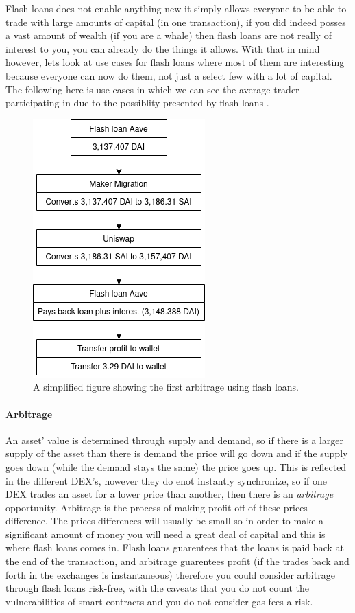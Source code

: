Flash loans does not enable anything new it simply allows everyone to be able to trade with large amounts of capital (in one transaction), if you did indeed posses a vast amount of wealth (if you are a whale) then flash loans are not really of interest to you, you can already do the things it allows. With that in mind however, lets look at use cases for flash loans where most of them are interesting because everyone can now do them, not just a select few with a lot of capital. The following here is use-cases in which we can see the average trader participating in due to the possiblity presented by flash loans \cite{attack}.

\begin{figure}
  \centering
  \includegraphics[width=.2\textwidth]{assests/Flash-loans-18-jan}
  \caption{A simplified figure showing the first arbitrage using flash loans.}
  \label{fig:firstArb}
\end{figure}
\paragraph{Arbitrage} An asset' value is determined through supply and demand, so if there is a larger supply of the asset than there is demand the price will go down and if the supply goes down (while the demand stays the same) the price goes up. This is reflected in the different DEX's, however they do enot instantly synchronize, so if one DEX trades an asset for a lower price than another, then there is an \textit{arbitrage} opportunity. Arbitrage is the process of making profit off of these prices difference. The prices differences will usually be small so in order to make a significant amount of money you will need a great deal of capital and this is where flash loans comes in. Flash loans guarentees that the loans is paid back at the end of the transaction, and arbitrage guarentees profit (if the trades back and forth in the exchanges is instantaneous) therefore you could consider arbitrage through flash loans risk-free, with the caveats that you do not count the vulnerabilities of smart contracts and you do not consider gas-fees a risk.

